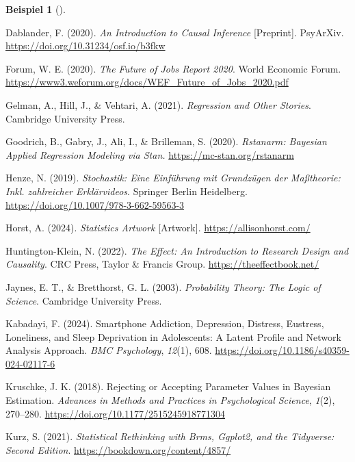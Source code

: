\documentclass[
  ngerman,
  letterpaper,
  twoside,
  open=any]{scrbook}
\newlength{\cslhangindent}
\newenvironment{CSLReferences}[2] %
 {\begin{list}{}{%
  \setlength{\itemindent}{0pt}
  \setlength{\leftmargin}{0pt}
  \setlength{\parsep}{0pt}
  \ifodd #1
   \setlength{\leftmargin}{\cslhangindent}
   \setlength{\itemindent}{-1\cslhangindent}
  \fi
  \setlength{\itemsep}{#2\baselineskip}}}
 {\end{list}}
\theoremstyle{definition}
\newtheorem{example}{Beispiel}[chapter]
\theoremstyle{plain}
\theoremstyle{definition}
\theoremstyle{definition}
\theoremstyle{remark}
\begin{document}
\begin{example}[]
\begin{CSLReferences}{1}{0}
Dablander, F. (2020). \emph{An {Introduction} to {Causal Inference}}
{[}Preprint{]}. PsyArXiv. \url{https://doi.org/10.31234/osf.io/b3fkw}

Forum, W. E. (2020). \emph{The {Future} of {Jobs Report} 2020}. World
Economic Forum.
\url{https://www3.weforum.org/docs/WEF_Future_of_Jobs_2020.pdf}

Gelman, A., Hill, J., \& Vehtari, A. (2021). \emph{Regression and Other
Stories}. Cambridge University Press.

Goodrich, B., Gabry, J., Ali, I., \& Brilleman, S. (2020).
\emph{Rstanarm: {Bayesian} Applied Regression Modeling via {Stan}.}
\url{https://mc-stan.org/rstanarm}

Henze, N. (2019). \emph{Stochastik: Eine Einführung mit Grundzügen der
Maßtheorie: Inkl. zahlreicher Erklärvideos}. Springer Berlin Heidelberg.
\url{https://doi.org/10.1007/978-3-662-59563-3}

Horst, A. (2024). \emph{Statistics {Artwork}} {[}Artwork{]}.
\url{https://allisonhorst.com/}

Huntington-Klein, N. (2022). \emph{The Effect: An Introduction to
Research Design and Causality}. CRC Press, Taylor \& Francis Group.
\url{https://theeffectbook.net/}

Jaynes, E. T., \& Bretthorst, G. L. (2003). \emph{Probability Theory:
The Logic of Science}. Cambridge University Press.

Kabadayi, F. (2024). Smartphone Addiction, Depression, Distress,
Eustress, Loneliness, and Sleep Deprivation in Adolescents: A Latent
Profile and Network Analysis Approach. \emph{BMC Psychology},
\emph{12}(1), 608. \url{https://doi.org/10.1186/s40359-024-02117-6}

Kruschke, J. K. (2018). Rejecting or {Accepting Parameter Values} in
{Bayesian Estimation}. \emph{Advances in Methods and Practices in
Psychological Science}, \emph{1}(2), 270--280.
\url{https://doi.org/10.1177/2515245918771304}

Kurz, S. (2021). \emph{Statistical {Rethinking} with {Brms}, {Ggplot2},
and the {Tidyverse}: {Second Edition}}.
\url{https://bookdown.org/content/4857/}


\end{CSLReferences}
\end{example}
\end{document}
